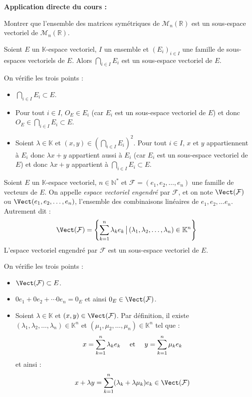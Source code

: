 \documentclass[french,11pt,twoside]{VcCours}
\newenvironment{ApplicationDirecte}{\textbf{Application directe du cours :}

}{}
\begin{document}
\begin{ApplicationDirecte} Montrer que l'ensemble des matrices symétriques de $\mathcal{M}_n(\mathbb{R})$ est un sous-espace vectoriel de $\mathcal{M}_n(\mathbb{R})$. \end{ApplicationDirecte}

\begin{Proposition}{}
Soient $E$ un $\mathbb{K}$-espace vectoriel, $I$ un ensemble et $(E_i)_{i \in I}$ une famille de sous-espaces vectoriels de $E$. Alors $\bigcap_{i \in I} E_i$ est un sous-espace vectoriel de $E$.
\end{Proposition}

\begin{Demonstration}{}
On vérifie les trois points :
\begin{itemize}
\item $\bigcap_{i \in I} E_i \subset E$.
\item Pour tout $i \in I$, $O_E \in E_i$ (car $E_i$ est un sous-espace vectoriel de $E$) et donc $O_E \in \bigcap_{i \in I} E_i \subset E$.
\item Soient $\lambda \in \mathbb{K}$ et $(x,y) \in \left(\bigcap_{i \in I} E_i \right)^2$. Pour tout $i \in I$, $x$ et $y$ appartiennent à $E_i$ donc $\lambda x+y$ appartient aussi à $E_i$ (car $E_i$ est un sous-espace vectoriel de $E$) et donc $\lambda x+y$ appartient à $\bigcap_{i \in I} E_i \subset E$.
\end{itemize}
\end{Demonstration}

\begin{TheoremeDefinition}{}
Soient $E$ un $\mathbb{K}$-espace vectoriel, $n \in \mathbb{N}^*$ et $\mathcal{F}=(e_1, e_2, \ldots, e_n)$ une famille de vecteurs de $E$. On appelle \emph{espace vectoriel engendré} par $\mathcal{F}$, et on note $\Vect(\mathcal{F})$ ou $\Vect(e_1, e_2, \ldots, e_n)$, l'ensemble des combinaisons linéaires de $e_1, e_2, \ldots e_n$. Autrement dit :
$$ \Vect(\mathcal{F}) = \left\lbrace \sum_{k=1}^n \lambda_k e_k \, \big{\vert} \,  (\lambda_1, \lambda_2, \ldots, \lambda_n) \in \mathbb{K}^n \right\rbrace$$
L'espace vectoriel engendré par $\mathcal{F}$ est un sous-espace vectoriel de $E$.
\end{TheoremeDefinition}

\begin{Demonstration}{}
On vérifie les trois points :
\begin{itemize}
\item $\Vect(\mathcal{F}) \subset E$.
\item $0 e_1 + 0 e_2 + \cdots 0 e_n = 0_E$ et ainsi $0_E \in \Vect(\mathcal{F})$.
\item Soient $\lambda \in \mathbb{K}$ et $(x,y) \in \Vect(\mathcal{F})$. Par définition, il existe $(\lambda_1, \lambda_2, \ldots, \lambda_n) \in \mathbb{K}^n$ et $(\mu_1, \mu_2, \ldots, \mu_n) \in \mathbb{K}^n$ tel que :
$$ x=\sum_{k=1}^n \lambda_k e_k \quad \hbox{ et } \quad y=\sum_{k=1}^n \mu_k e_k$$
et ainsi :
$$ x+ \lambda y = \sum_{k=1}^n (\lambda_k+ \lambda \mu_k) e_k \in \Vect(\mathcal{F})$$
\end{itemize}
\end{Demonstration}
\end{document}
